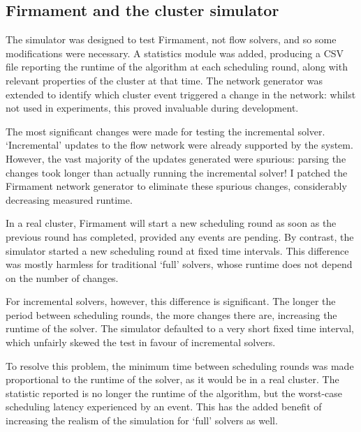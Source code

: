 \subsection{Firmament and the cluster simulator} \label{sec:impl-benchmark-simulator}

The simulator was designed to test Firmament, not flow solvers, and so some modifications were necessary. A statistics module was added, producing a CSV file reporting the runtime of the algorithm at each scheduling round, along with relevant properties of the cluster at that time. The network generator was extended to identify which cluster event triggered a change in the network: whilst not used in experiments, this proved invaluable during development.


The most significant changes were made for testing the incremental solver. `Incremental' updates to the flow network were already supported by the system. However, the vast majority of the updates generated were spurious: parsing the changes took longer than actually running the incremental solver! I patched the Firmament network generator to eliminate these spurious changes, considerably decreasing measured runtime.

In a real cluster, Firmament will start a new scheduling round as soon as the previous round has completed, provided any events are pending. By contrast, the simulator started a new scheduling round at fixed time intervals. This difference was mostly harmless for traditional `full' solvers, whose runtime does not depend on the number of changes. 

For incremental solvers, however, this difference is significant. The longer the period between scheduling rounds, the more changes there are, increasing the runtime of the solver. The simulator defaulted to a very short fixed time interval, which unfairly skewed the test in favour of incremental solvers. 

To resolve this problem, the minimum time between scheduling rounds was made proportional to the runtime of the solver, as it would be in a real cluster. The statistic reported is no longer the runtime of the algorithm, but the worst-case scheduling latency experienced by an event\footnotemark. This has the added benefit of increasing the realism of the simulation for `full' solvers as well.

